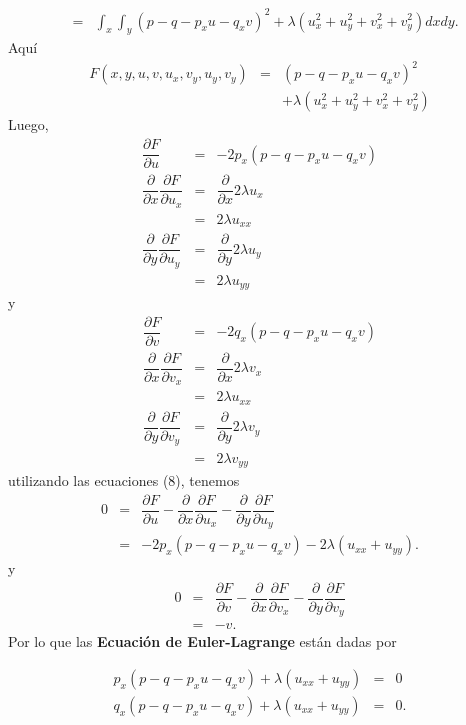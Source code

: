 \documentclass[11pt,letterpaper]{article}
\theoremstyle{definition}
\theoremstyle{definition}
\theoremstyle{definition}
\begin{document}
\begin{itemize}
{\begin{eqnarray*}
		& = & \int_x \int_y (p - q -p_x u - q_x v)^2 + \lambda (u_x^2 + u_y^2 + v_x^2 + v_y^2) dx dy.
	\end{eqnarray*}}
	Aquí
	\begin{eqnarray*}
		F(x,y,u,v, u_x, v_y, u_y, v_y) & = & (p - q -p_x u - q_x v)^2  \\
									   &   &+ \lambda (u_x^2 + u_y^2 + v_x^2 + v_y^2)
	\end{eqnarray*}
	Luego,
	\begin{eqnarray*}
		\dfrac{\partial F}{\partial u} & = &  -2 p_x (p - q -p_x u - q_x v) \\
		\dfrac{\partial}{\partial x} \dfrac{\partial F}{\partial u_x} & = &  \dfrac{\partial}{\partial x} 2 \lambda u_x\\
		& = & 2 \lambda u_{xx} \\
		\dfrac{\partial}{\partial y} \dfrac{\partial F}{\partial u_y} & = &  \dfrac{\partial}{\partial y} 2 \lambda u_y \\
		& = & 2 \lambda u_{yy}
	\end{eqnarray*}
	y 
	\begin{eqnarray*}
		\dfrac{\partial F}{\partial v} & = &  -2q_x(p - q -p_x u - q_x v) \\
		\dfrac{\partial}{\partial x} \dfrac{\partial F}{\partial v_x} & = &  \dfrac{\partial}{\partial x} 2 \lambda v_x\\
		& = & 2 \lambda u_{xx} \\
		\dfrac{\partial}{\partial y} \dfrac{\partial F}{\partial v_y} & = &  \dfrac{\partial}{\partial y} 2 \lambda v_y \\
		& = & 2 \lambda v_{yy}
	\end{eqnarray*}
	utilizando las ecuaciones (8), tenemos 
		\begin{eqnarray*}
			0 & = & \dfrac{\partial F}{\partial u} - \dfrac{\partial}{\partial x} \dfrac{\partial F}{\partial u_x}  - \dfrac{\partial}{\partial y} \dfrac{\partial F}{\partial u_y} \\
			& = & -2 p_x (p - q -p_x u - q_x v) - 2\lambda (u_{xx} + u_{yy}).
		\end{eqnarray*}
	y 
	\begin{eqnarray*}
		0 & = & \dfrac{\partial F}{\partial v} - \dfrac{\partial}{\partial x} \dfrac{\partial F}{\partial v_x}  - \dfrac{\partial}{\partial y} \dfrac{\partial F}{\partial v_y} \\
		& = & -v.
	\end{eqnarray*}
Por lo que las \textbf{Ecuación de Euler-Lagrange} están dadas por
\begin{shaded*}
	\begin{eqnarray*}
		p_x (p - q -p_x u - q_x v) + \lambda (u_{xx} + u_{yy}) & = & 0 \\
		q_x (p - q -p_x u - q_x v) + \lambda (u_{xx} + u_{yy}) & = & 0.
	\end{eqnarray*}
\end{shaded*}
\end{itemize}
\end{document}
